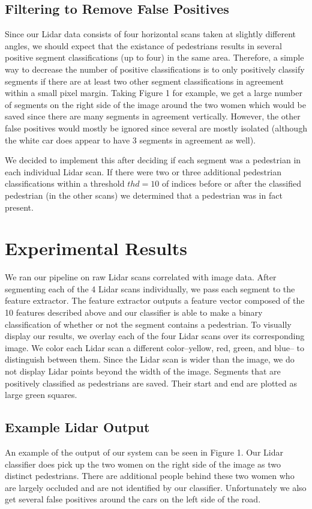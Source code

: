 \documentclass[10pt,twocolumn,letterpaper]{article}
\begin{document}
  \subsection{Filtering to Remove False Positives}
  Since our Lidar data consists of four horizontal scans taken at slightly different angles,
  we should expect that the existance of pedestrians results in several positive segment
  classifications (up to four) in the same area. Therefore, a simple way to decrease
  the number of positive classifications is to only positively classify segments if there
  are at least two other segment classifications in agreement within a small pixel margin.
  Taking Figure 1 for example, we get a large number of segments on the right side
  of the image around the two women which would be saved since there are many segments in
  agreement vertically. However, the other false positives would mostly be ignored
  since several are mostly isolated (although the white car does appear to have 3 segments
  in agreement as well).

  We decided to implement this after deciding if each segment was a pedestrian
  in each individual Lidar scan. If there were two or three additional pedestrian
  classifications within a threshold $ thd = 10 $ of indices before or after 
  the classified pedestrian (in the other scans) we determined that 
  a pedestrian was in fact present.

\section{Experimental Results}
  We ran our pipeline on raw Lidar scans correlated with image data. After
  segmenting each of the 4 Lidar scans individually, we pass each segment to the
  feature extractor. The feature extractor outputs a feature vector composed of
  the 10 features described above and our classifier is able to make a binary
  classification of whether or not the segment contains a pedestrian. To visually
  display our results, we overlay each of the four Lidar scans over its corresponding
  image. We color each Lidar scan a different color--yellow, red, green, and blue--
  to distinguish between them. Since the Lidar scan is wider than the image,
  we do not display Lidar points beyond the width of the image. Segments that are
  positively classified as pedestrians are saved. Their start and end are plotted
  as large green squares.


  \subsection{Example Lidar Output}
  An example of the output of our system can be seen in Figure 1. Our Lidar
  classifier does pick up the two women on the right side of the image as two
  distinct pedestrians. There are additional people behind these two women
  who are largely occluded and are not identified by our classifier. Unfortunately
  we also get several false positives around the cars on the left side of the road.
 
\end{document}
